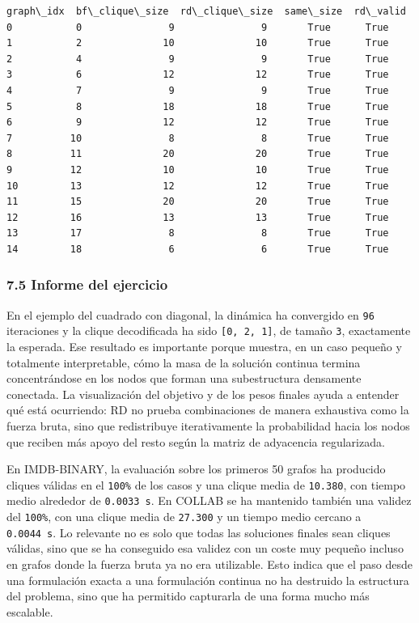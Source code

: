 \documentclass[11pt]{article}
\begin{document}
    
    \begin{Verbatim}[commandchars=\\\{\}]
    graph\_idx  bf\_clique\_size  rd\_clique\_size  same\_size  rd\_valid
0           0               9               9       True      True
1           2              10              10       True      True
2           4               9               9       True      True
3           6              12              12       True      True
4           7               9               9       True      True
5           8              18              18       True      True
6           9              12              12       True      True
7          10               8               8       True      True
8          11              20              20       True      True
9          12              10              10       True      True
10         13              12              12       True      True
11         15              20              20       True      True
12         16              13              13       True      True
13         17               8               8       True      True
14         18               6               6       True      True
    \end{Verbatim}

    
    \subsubsection{7.5 Informe del ejercicio}\label{informe-del-ejercicio}

En el ejemplo del cuadrado con diagonal, la dinámica ha convergido en
\texttt{96} iteraciones y la clique decodificada ha sido
\texttt{{[}0,\ 2,\ 1{]}}, de tamaño \texttt{3}, exactamente la esperada.
Ese resultado es importante porque muestra, en un caso pequeño y
totalmente interpretable, cómo la masa de la solución continua termina
concentrándose en los nodos que forman una subestructura densamente
conectada. La visualización del objetivo y de los pesos finales ayuda a
entender qué está ocurriendo: RD no prueba combinaciones de manera
exhaustiva como la fuerza bruta, sino que redistribuye iterativamente la
probabilidad hacia los nodos que reciben más apoyo del resto según la
matriz de adyacencia regularizada.

En IMDB-BINARY, la evaluación sobre los primeros 50 grafos ha producido
cliques válidas en el \texttt{100\%} de los casos y una clique media de
\texttt{10.380}, con tiempo medio alrededor de \texttt{0.0033\ s}. En
COLLAB se ha mantenido también una validez del \texttt{100\%}, con una
clique media de \texttt{27.300} y un tiempo medio cercano a
\texttt{0.0044\ s}. Lo relevante no es solo que todas las soluciones
finales sean cliques válidas, sino que se ha conseguido esa validez con
un coste muy pequeño incluso en grafos donde la fuerza bruta ya no era
utilizable. Esto indica que el paso desde una formulación exacta a una
formulación continua no ha destruido la estructura del problema, sino
que ha permitido capturarla de una forma mucho más escalable.
\end{document}
